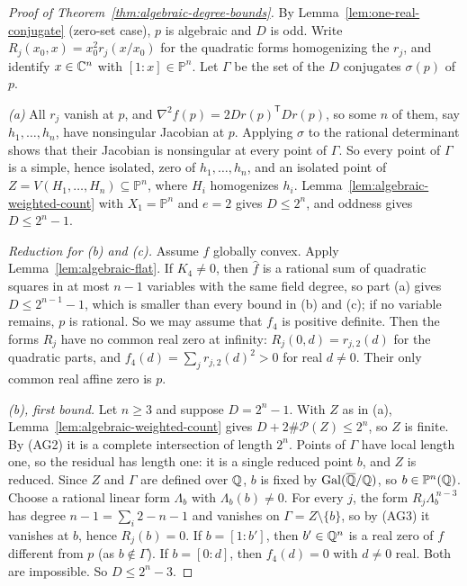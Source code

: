 \begin{proof}[Proof of Theorem~\ref{thm:algebraic-degree-bounds}]
By Lemma~\ref{lem:one-real-conjugate} (zero-set case), $p$ is algebraic and
$D$ is odd. Write $R_j(x_0,x)=x_0^2r_j(x/x_0)$ for the quadratic forms
homogenizing the $r_j$, and identify $x\in\mathbb C^n$ with $[1:x]\in\mathbb P^n$.
Let $\Gamma$ be the set of the $D$ conjugates $\sigma(p)$ of $p$.

\emph{(a)} All $r_j$ vanish at $p$, and $\nabla^2f(p)=2Dr(p)^{\mathsf
T}Dr(p)$, so some $n$ of them, say $h_1,\ldots,h_n$, have nonsingular Jacobian
at $p$. Applying $\sigma$ to the rational determinant shows that their
Jacobian is nonsingular at every point of $\Gamma$. So every point of $\Gamma$
is a simple, hence isolated, zero of $h_1,\ldots,h_n$, and an isolated point of
$Z=V(H_1,\ldots,H_n)\subseteq\mathbb P^n$, where $H_i$ homogenizes $h_i$.
Lemma~\ref{lem:algebraic-weighted-count} with $X_1=\mathbb P^n$ and $e=2$ gives
$D\le2^n$, and oddness gives $D\le2^n-1$.

\emph{Reduction for (b) and (c).} Assume $f$ globally convex. Apply
Lemma~\ref{lem:algebraic-flat}. If $K_4\ne0$, then $\hat f$ is a rational sum of
quadratic squares in at most $n-1$ variables with the same field degree, so
part (a) gives $D\le2^{n-1}-1$, which is smaller than every bound in (b) and
(c); if no variable remains, $p$ is rational. So we may assume that $f_4$ is
positive definite. Then the forms $R_j$ have no common real zero at infinity:
$R_j(0,d)=r_{j,2}(d)$ for the quadratic parts, and $f_4(d)=\sum_jr_{j,2}(d)^2>0$
for real $d\ne0$. Their only common real affine zero is $p$.

\emph{(b), first bound.} Let $n\ge3$ and suppose $D=2^n-1$. With $Z$ as in (a),
Lemma~\ref{lem:algebraic-weighted-count} gives
$D+2\#\mathcal P(Z)\le2^n$, so $Z$ is finite. By (AG2) it is a complete
intersection of length $2^n$. Points of $\Gamma$ have local length one, so the
residual has length one: it is a single reduced point $b$, and $Z$ is
reduced. Since $Z$ and $\Gamma$ are defined over $\mathbb Q$, $b$ is fixed by
$\operatorname{Gal}(\overline{\mathbb Q}/\mathbb Q)$, so $b\in\mathbb P^n(\mathbb Q)$. Choose a
rational linear form $\Lambda_b$ with $\Lambda_b(b)\ne0$. For every $j$, the
form $R_j\Lambda_b^{\,n-3}$ has degree $n-1=\sum_i2-n-1$ and vanishes on
$\Gamma=Z\setminus\{b\}$, so by (AG3) it vanishes at $b$, hence $R_j(b)=0$. If
$b=[1:b']$, then $b'\in\mathbb Q^n$ is a real zero of $f$ different from $p$ (as
$b\notin\Gamma$). If $b=[0:d]$, then $f_4(d)=0$ with $d\ne0$ real. Both are
impossible. So $D\le2^n-3$.


\end{proof}
